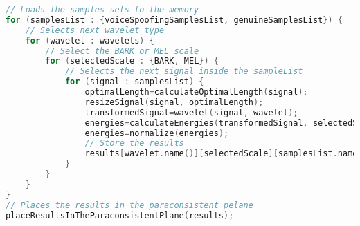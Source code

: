 \begin{lstlisting}[language=C++, caption={Procedure 1 algorithm}, label={lst:experiment01Algo}]
// Loads the samples sets to the memory
for (samplesList : {voiceSpoofingSamplesList, genuineSamplesList}) {
	// Selects next wavelet type
	for (wavelet : wavelets) {
		// Select the BARK or MEL scale
		for (selectedScale : {BARK, MEL}) {
			// Selects the next signal inside the sampleList
			for (signal : samplesList) {
				optimalLength=calculateOptimalLength(signal);
				resizeSignal(signal, optimalLength);
				transformedSignal=wavelet(signal, wavelet);
				energies=calculateEnergies(transformedSignal, selectedScale);
				energies=normalize(energies);
				// Store the results
				results[wavelet.name()][selectedScale][samplesList.name()].add(energies);
			}
		}
	}
}
// Places the results in the paraconsistent pelane
placeResultsInTheParaconsistentPlane(results);
\end{lstlisting}